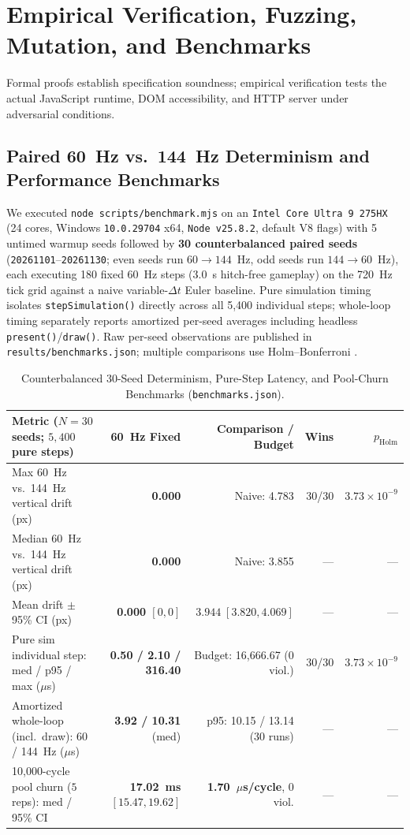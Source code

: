 \documentclass[11pt,letterpaper]{article}
\theoremstyle{remark}
\begin{document}
\section{Empirical Verification, Fuzzing, Mutation, and Benchmarks}
\label{sec:eval}

Formal proofs establish specification soundness; empirical verification tests the actual JavaScript runtime, DOM accessibility, and HTTP server under adversarial conditions.

\subsection{Paired 60~Hz vs.\ 144~Hz Determinism and Performance Benchmarks}
We executed \texttt{node scripts/benchmark.mjs} on an \texttt{Intel Core Ultra 9 275HX} (24 cores, Windows \texttt{10.0.29704} x64, \texttt{Node v25.8.2}, default V8 flags) with 5 untimed warmup seeds followed by \textbf{30 counterbalanced paired seeds} (\texttt{20261101}--\texttt{20261130}; even seeds run $60\to 144$~Hz, odd seeds run $144\to 60$~Hz), each executing 180 fixed 60~Hz steps (3.0~s hitch-free gameplay) on the 720~Hz tick grid against a naive variable-$\Delta t$ Euler baseline. Pure simulation timing isolates \texttt{stepSimulation()} directly across all 5,400 individual steps; whole-loop timing separately reports amortized per-seed averages including headless \texttt{present()}/\texttt{draw()}. Raw per-seed observations are published in \texttt{results/benchmarks.json}; multiple comparisons use Holm--Bonferroni \cite{holm1979}.

\begin{table}[ht]
\centering
\caption{Counterbalanced 30-Seed Determinism, Pure-Step Latency, and Pool-Churn Benchmarks (\texttt{benchmarks.json}).}
\label{tab:bench}
\scriptsize
\setlength{\tabcolsep}{3.5pt}
\begin{tabular}{@{} l r r r r @{}}
\toprule
\textbf{Metric ($N=30$ seeds; $5{,}400$ pure steps)} & \textbf{60~Hz Fixed} & \textbf{Comparison / Budget} & \textbf{Wins} & \textbf{$p_{\text{Holm}}$} \\
\midrule
Max 60~Hz vs.\ 144~Hz vertical drift (px) & \textbf{0.000} & Naive: 4.783 & 30/30 & $3.73\times 10^{-9}$ \\
Median 60~Hz vs.\ 144~Hz vertical drift (px) & \textbf{0.000} & Naive: 3.855 & --- & --- \\
Mean drift $\pm$ 95\% CI (px) & \textbf{0.000 $[0, 0]$} & $3.944\;[3.820, 4.069]$ & --- & --- \\
Pure sim individual step: med / p95 / max ($\mu$s) & \textbf{0.50 / 2.10 / 316.40} & Budget: 16,666.67 (0 viol.) & 30/30 & $3.73\times 10^{-9}$ \\
Amortized whole-loop (incl.\ draw): 60 / 144~Hz ($\mu$s) & \textbf{3.92 / 10.31} (med) & p95: 10.15 / 13.14 (30 runs) & --- & --- \\
10,000-cycle pool churn ($5$ reps): med / 95\% CI & \textbf{17.02~ms $[15.47, 19.62]$} & \textbf{1.70~$\mu$s/cycle}, 0 viol. & --- & --- \\
\bottomrule
\end{tabular}
\end{table}
\end{document}
